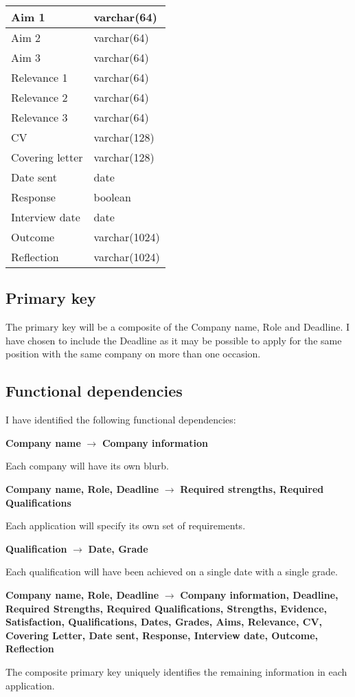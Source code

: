 \documentclass[a4paper, twoside]{article}
\begin{document}
\begin{center}
\begin{tabular}{|l|l|}
Aim 1 & varchar(64) \\ \hline
Aim 2 & varchar(64) \\ \hline
Aim 3 & varchar(64) \\ \hline
Relevance 1 & varchar(64) \\ \hline
Relevance 2 & varchar(64) \\ \hline
Relevance 3 & varchar(64) \\ \hline
CV & varchar(128) \\ \hline
Covering letter & varchar(128) \\ \hline
Date sent & date \\ \hline
Response & boolean \\ \hline
Interview date & date \\ \hline
Outcome & varchar(1024) \\ \hline
Reflection & varchar(1024) \\
\hline
\end{tabular}
\end{center}

\subsection{Primary key}
The primary key will be a composite of the Company name, Role and Deadline. I
have chosen to include the Deadline as it may be possible to apply for the same
position with the same company on more than one occasion.

\newpage
\subsection{Functional dependencies}
I have identified the following functional dependencies:

\begin{center}
  \textbf{Company name} $\rightarrow$ \textbf{Company information}
\end{center}
Each company will have its own blurb.

\begin{center}
  \textbf{Company name, Role, Deadline} $\rightarrow$ \textbf{Required strengths, Required
  Qualifications}
\end{center}
Each application will specify its own set of requirements.

\begin{center}
  \textbf{Qualification} $\rightarrow$ \textbf{Date, Grade}
\end{center}
Each qualification will have been achieved on a single date with a single grade.

\begin{center}
  \textbf{Company name, Role, Deadline} $\rightarrow$ \textbf{Company
    information, Deadline, Required Strengths, Required Qualifications,
    Strengths, Evidence, Satisfaction, Qualifications, Dates, Grades, Aims,
    Relevance, CV, Covering Letter, Date sent, Response, Interview date,
  Outcome, Reflection}
\end{center}
The composite primary key uniquely identifies the remaining information in each
application.
\end{document}
